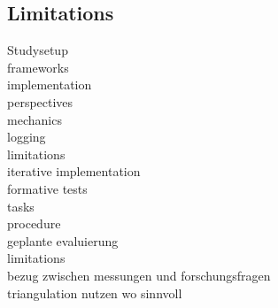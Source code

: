 \subsection{Limitations}
\label{sec:limitations}





Studysetup\\
frameworks\\
implementation\\
perspectives\\
mechanics\\
logging\\
limitations\\
iterative implementation\\
formative tests\\

tasks\\
procedure\\
geplante evaluierung\\
limitations\\
bezug zwischen messungen und forschungsfragen\\
triangulation nutzen wo sinnvoll\\
